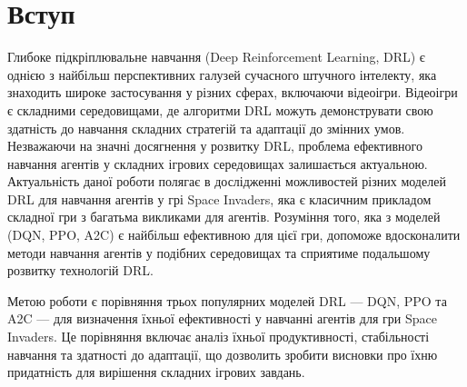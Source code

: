 
 \normalsize
 \chapter*{Вступ}
 Глибоке підкріплювальне навчання (Deep Reinforcement Learning, DRL) є 
 однією з найбільш перспективних галузей сучасного штучного інтелекту, 
 яка знаходить широке застосування у різних сферах, включаючи відеоігри. 
 Відеоігри є складними середовищами, де алгоритми DRL можуть демонструвати
  свою здатність до навчання складних стратегій та адаптації до змінних
   умов. Незважаючи на значні досягнення у розвитку DRL, проблема 
   ефективного навчання агентів у складних ігрових середовищах залишається
    актуальною.
 Актуальність даної роботи полягає в дослідженні можливостей різних
  моделей DRL для навчання агентів у грі Space Invaders, яка є класичним
   прикладом складної гри з багатьма викликами для агентів. 
   Розуміння того, яка з моделей (DQN, PPO, A2C) є найбільш 
   ефективною для цієї гри, допоможе вдосконалити методи навчання 
   агентів у подібних середовищах та сприятиме подальшому розвитку технологій DRL.
 
 Метою роботи є порівняння трьох популярних моделей DRL — DQN, PPO та 
 A2C — для визначення їхньої ефективності у навчанні агентів для гри 
 Space Invaders. Це порівняння включає аналіз їхньої продуктивності, 
 стабільності навчання та здатності до адаптації, що дозволить зробити
  вис\-новки про їхню придатність для вирішення складних ігрових завдань.
 
